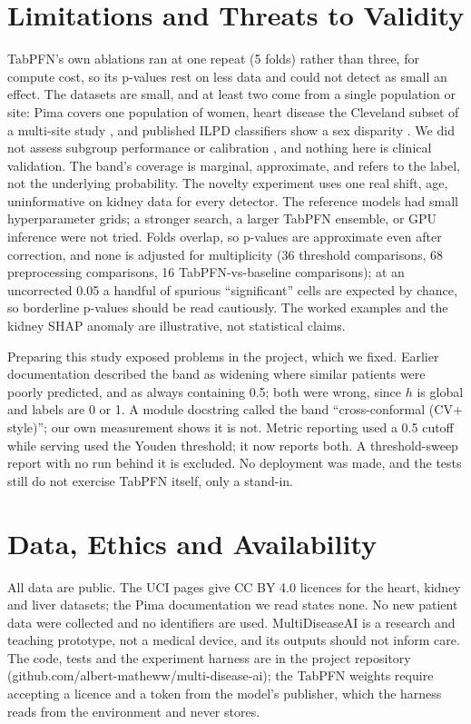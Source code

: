 \documentclass[conference]{IEEEtran}
\begin{document}
\section{Limitations and Threats to Validity}

TabPFN's own ablations ran at one repeat (5 folds) rather than three, for compute cost, so its p-values rest on less data and could not detect as small an effect. The datasets are small, and at least two come from a single population or site: Pima covers one population of women, heart disease the Cleveland subset of a multi-site study \cite{detrano1989}, and published ILPD classifiers show a sex disparity \cite{straw2022}. We did not assess subgroup performance or calibration \cite{guo2017}, and nothing here is clinical validation. The band's coverage is marginal, approximate, and refers to the label, not the underlying probability. The novelty experiment uses one real shift, age, uninformative on kidney data for every detector. The reference models had small hyperparameter grids; a stronger search, a larger TabPFN ensemble, or GPU inference were not tried. Folds overlap, so p-values are approximate even after correction, and none is adjusted for multiplicity (36 threshold comparisons, 68 preprocessing comparisons, 16 TabPFN-vs-baseline comparisons); at an uncorrected 0.05 a handful of spurious ``significant'' cells are expected by chance, so borderline p-values should be read cautiously. The worked examples and the kidney SHAP anomaly are illustrative, not statistical claims.

Preparing this study exposed problems in the project, which we fixed. Earlier documentation described the band as widening where similar patients were poorly predicted, and as always containing 0.5; both were wrong, since $h$ is global and labels are 0 or 1. A module docstring called the band ``cross-conformal (CV+ style)''; our own measurement shows it is not. Metric reporting used a 0.5 cutoff while serving used the Youden threshold; it now reports both. A threshold-sweep report with no run behind it is excluded. No deployment was made, and the tests still do not exercise TabPFN itself, only a stand-in.

\section{Data, Ethics and Availability}

All data are public. The UCI pages give CC BY 4.0 licences for the heart, kidney and liver datasets; the Pima documentation we read states none. No new patient data were collected and no identifiers are used. MultiDiseaseAI is a research and teaching prototype, not a medical device, and its outputs should not inform care. The code, tests and the experiment harness are in the project repository (github.com/albert-matheww/multi-disease-ai); the TabPFN weights require accepting a licence and a token from the model's publisher, which the harness reads from the environment and never stores.
\end{document}
